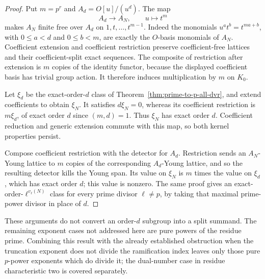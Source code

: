 \begin{proof}
Put \(m=p^r\) and \(A_d=O[u]/(u^d)\).
The map
\[
 A_d\longrightarrow A_N,\qquad u\longmapsto t^m
\]
makes \(A_N\) finite free over \(A_d\) on
\(1,t,\ldots,t^{m-1}\).  Indeed the monomials
\(u^a t^b=t^{ma+b}\), with \(0\le a<d\) and \(0\le b<m\),
are exactly the \(O\)-basis monomials of \(A_N\).
Coefficient extension and coefficient restriction preserve
coefficient-free lattices and their coefficient-split exact sequences.
The composite of restriction after extension is \(m\) copies of the
identity functor, because the displayed coefficient basis has trivial
group action.  It therefore induces multiplication by \(m\) on \(K_0\).

Let \(\xi_d\) be the exact-order-\(d\) class of
Theorem~\ref{thm:prime-to-p-all-dvr}, and extend coefficients to
obtain \(\xi_N\).  It satisfies \(d\xi_N=0\), whereas its coefficient
restriction is \(m\xi_d\), of exact order \(d\) since \((m,d)=1\).
Thus \(\xi_N\) has exact order \(d\).
Coefficient reduction and generic extension commute with this map,
so both kernel properties persist.

Compose coefficient restriction with the detector for \(A_d\).
Restriction sends an \(A_N\)-Young lattice to \(m\) copies of the
corresponding \(A_d\)-Young lattice, and so the resulting detector
kills the Young span.  Its value on \(\xi_N\) is \(m\) times
the value on \(\xi_d\), which has exact order \(d\); this value
is nonzero.  The same proof gives an exact-order-\(\ell^{v_\ell(N)}\)
class for every prime divisor \(\ell\ne p\), by taking that maximal
prime-power divisor in place of \(d\).
\end{proof}

\begin{remark}
These arguments do not convert an order-\(d\) subgroup into a split
summand.  The remaining exponent cases not addressed here are pure
powers of the residue prime.  Combining this result with the
already established obstruction when the truncation exponent does
not divide the ramification index leaves only those pure
\(p\)-power exponents which do divide it; the dual-number case in
residue characteristic two is covered separately.
\end{remark}
